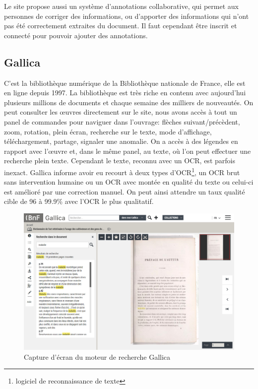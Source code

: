         Le site propose aussi un système d’annotations collaborative, qui permet aux personnes de corriger
        des informations, ou d’apporter des informations qui n’ont pas été correctement extraites du document.
        Il faut cependant être inscrit et connecté pour pouvoir ajouter des annotations.

        \subsection{Gallica}
        \label{subsec:gallica}
        C’est la bibliothèque numérique de la Bibliothèque nationale de France, elle est en ligne depuis 1997.
        La bibliothèque est très riche en contenu avec aujourd’hui plusieurs millions de documents
        et chaque semaine des milliers de nouveautés. On peut consulter les œuvres directement sur le site,
        nous avons accès à tout un panel de commandes pour naviguer dans l’ouvrage: flèches suivant/précèdent,
        zoom, rotation, plein écran, recherche sur le texte, mode d’affichage, téléchargement, partage,
        signaler une anomalie. On a accès à des légendes en rapport avec l’œuvre et, dans le même panel,
        au texte, où l’on peut effectuer une recherche plein texte. Cependant le texte, reconnu avec un OCR,
        est parfois inexact. Gallica informe avoir eu recourt à deux types d’OCR\footnote{logiciel de reconnaissance de texte},
        un OCR brut sans intervention humaine ou un OCR avec montée en qualité du texte ou celui-ci est amélioré par une correction manuel.
        On peut ainsi attendre un taux qualité cible de 96 à 99.9\% avec l’OCR le plus qualitatif.

        \begin{figure}[H]
            \centering
            \includegraphics[width=1\textwidth]{figure/screenshot_gallica.jpg}
            \caption{Capture d'écran du moteur de recherche Gallica}
            \label{fig:gallica}
        \end{figure}

